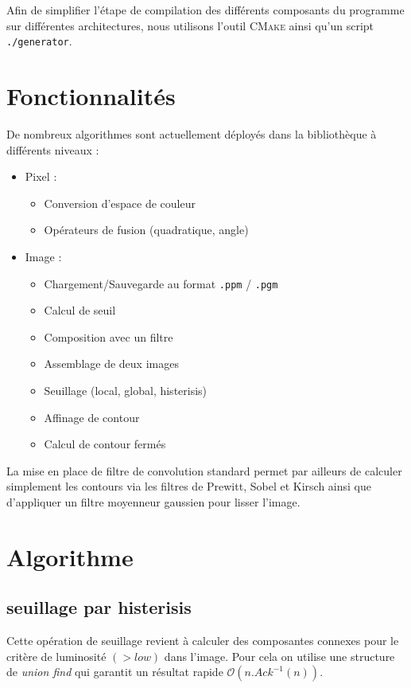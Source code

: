 Afin de simplifier l'étape de compilation des différents composants du programme sur différentes architectures, nous utilisons l'outil \textsc{CMake} ainsi qu'un script \texttt{./generator}.


\section{Fonctionnalités}

De nombreux algorithmes sont actuellement déployés dans la bibliothèque à différents niveaux :

\begin{itemize}
	\item Pixel :
		\begin{itemize}
			\item Conversion d'espace de couleur
			\item Opérateurs de fusion (quadratique, angle)
		\end{itemize}
	\item Image :
		\begin{itemize}
			\item Chargement/Sauvegarde au format \texttt{.ppm} / \texttt{.pgm}
			\item Calcul de seuil
			\item Composition avec un filtre
			\item Assemblage de deux images
			\item Seuillage (local, global, histerisis)
			\item Affinage de contour
			\item Calcul de contour fermés
		\end{itemize}
\end{itemize}

La mise en place de filtre de convolution standard permet par ailleurs de calculer simplement les contours via les filtres de Prewitt, Sobel et Kirsch ainsi que d'appliquer un filtre moyenneur gaussien pour lisser l'image.



\section{Algorithme}
\subsection{seuillage par histerisis}
Cette opération de seuillage revient à calculer des composantes connexes pour le critère de luminosité $(>low)$ dans l'image. Pour cela on utilise une structure de \emph{union find} qui garantit un résultat rapide $\mathcal O(n.Ack^{-1}(n))$.

